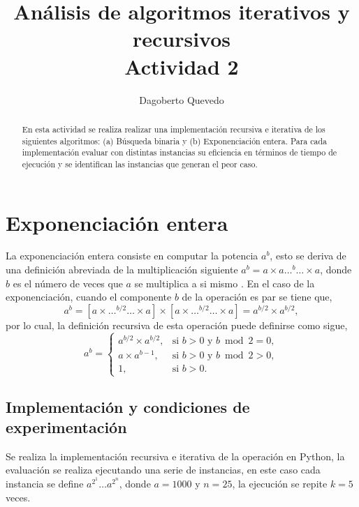 \documentclass[letterpaper,11pt]{article}
\begin{document}
\title{Análisis de algoritmos iterativos y recursivos\\\large Actividad 2}
\author{Dagoberto Quevedo}
\maketitle

\begin{abstract}
En esta actividad se realiza realizar una implementación recursiva e iterativa de los siguientes algoritmos: (a) Búsqueda binaria y (b) Exponenciación entera. Para cada implementación evaluar con distintas instancias su eficiencia en términos de tiempo de ejecución y se identifican las instancias que generan el peor caso.
\end{abstract}

\section{Exponenciación entera}

La exponenciación entera consiste en computar la potencia $a^b$, esto se deriva de una definición abreviada de la multiplicación siguiente $a^b=a\times a \dots^b \dots \times a$, donde $b$ es el número de veces que $a$ se multiplica a si mismo \cite{utem2004}. En el caso de la exponenciación, cuando el componente $b$ de la operación es par se tiene que,
\begin{equation}
	a^b = [a \times \dots ^{b/2} \dots \times a] \times [a \times \dots ^{b/2} \dots \times a]  = a^{b/2} \times a^{b/2},
\end{equation}
por lo cual, la definición recursiva de esta operación puede definirse como sigue,
\[
    a^b= 
\begin{cases}
    a^{b/2} \times a^{b/2}	,& \text{si } b> 0 \text{ y }  b \bmod 2 = 0, \\
    a\times a^{b-1}		,& \text{si } b> 0 \text{ y }  b \bmod 2 > 0, \\
    1					,& \text{si } b>0.
\end{cases}
\]
\subsection{Implementación y condiciones de experimentación}
Se realiza la implementación recursiva e iterativa de la operación en Python, la evaluación se realiza ejecutando una serie de instancias, en este caso cada instancia se define $a^{2^1} \dots a^{2^n}$, donde $a=1000$ y $n=25$, la ejecución se repite $k=5$ veces.
\end{document}
